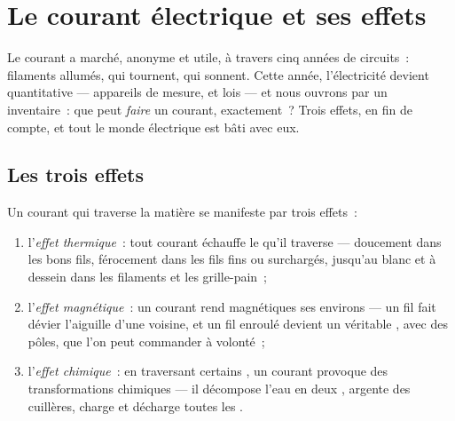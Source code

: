 \chapter{Le courant électrique et ses effets}\label{ch:g8:electric-current-effects}

Le courant a marché, anonyme et utile, à travers cinq années de
circuits~: filaments allumés,  qui tournent,  qui
sonnent. Cette année, l'électricité devient quantitative ---
appareils de mesure,  et lois --- et nous ouvrons par un
inventaire~: que peut \emph{faire} un courant, exactement~? Trois
effets, en fin de compte, et tout le monde électrique est bâti avec
eux.

\section{Les trois effets}

\begin{proposition}\label{prop:g8:electric-current-effects:three}
Un courant qui traverse la matière se manifeste par trois effets~:
\begin{enumerate}
  \item l'\emph{effet thermique}~: tout
        courant échauffe le  qu'il traverse ---
        doucement dans les bons fils, férocement dans les fils fins
        ou surchargés, jusqu'au blanc et à dessein dans les
        filaments et les grille-pain~;
  \item l'\emph{effet magnétique}~: un
        courant rend magnétiques ses environs --- un fil fait
        dévier l'aiguille d'une  voisine, et un fil enroulé
        devient un véritable , avec des pôles, que l'on peut
        commander à volonté~;
  \item l'\emph{effet chimique}~: en
        traversant certains , un courant provoque des
        transformations chimiques --- il décompose l'eau en deux
        , argente des cuillères, charge et décharge toutes les
        .
\end{enumerate}
\end{proposition}


